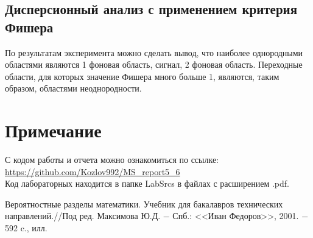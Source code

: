 \documentclass[a4paper]{article}
\begin{document}
\subsection{Дисперсионный анализ с применением критерия Фишера}
По результатам эксперимента можно сделать вывод, что наиболее однородными областями являются 1 фоновая область, сигнал, 2 фоновая область. Переходные области, для которых значение Фишера много больше 1, являются, таким образом, областями неоднородности.
\section*{Примечание}
С кодом работы и отчета можно ознакомиться по ссылке:\\\url{https://github.com/Kozlov992/MS_report5_6}\\
Код лабораторных находится в папке LabSrcs в файлах с расширением .pdf.
\begin{thebibliography}{9}
 Вероятностные разделы математики. Учебник для бакалавров технических направлений.//Под ред. Максимова Ю.Д. $-$ Спб.: <<Иван Федоров>>, 2001. $-$ 592 c., илл.

\end{thebibliography}
\end{document}
